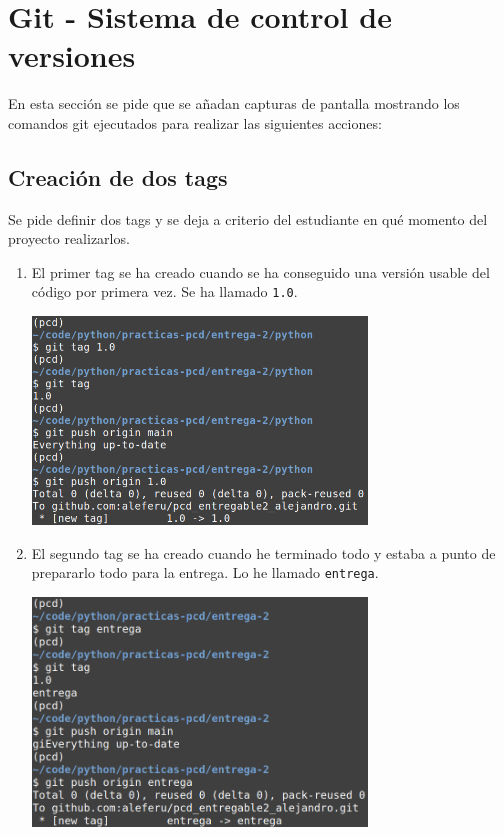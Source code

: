 \section{Git - Sistema de control de versiones}

En esta sección se pide que se añadan capturas de pantalla mostrando los comandos git ejecutados para realizar las siguientes acciones:

\subsection{Creación de dos tags}

Se pide definir dos tags y se deja a criterio del estudiante en qué momento del proyecto realizarlos.

\begin{enumerate}
    \item El primer tag se ha creado cuando se ha conseguido una versión usable del código por primera vez. Se ha llamado \texttt{1.0}.

    \begin{center}
        \includegraphics[width=0.7\textwidth]{img/tag1.png}
    \end{center}

    \newpage

    \item El segundo tag se ha creado cuando he terminado todo y estaba a punto de prepararlo todo para la entrega. Lo he llamado \texttt{entrega}.

    \begin{center}
        \includegraphics[width=0.7\textwidth]{img/tagentrega.png}
    \end{center}
\end{enumerate}


